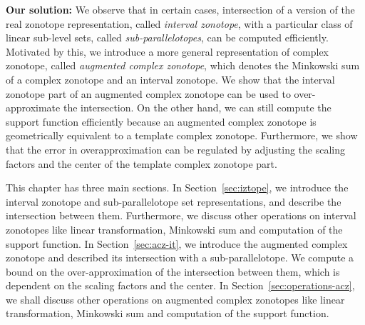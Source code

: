 {\bf Our solution: } We observe that in certain cases, intersection of
a version of the real zonotope representation, called \emph{interval
zonotope}, with a particular class of linear sub-level sets,
called \emph{sub-parallelotopes}, can be computed efficiently.
Motivated by this, we introduce a more general representation of
complex zonotope, called \emph{augmented complex zonotope}, which
denotes the Minkowski sum of a complex zonotope and an interval
zonotope.  We show that the interval zonotope part of an augmented
complex zonotope can be used to over-approximate the intersection.  On
the other hand, we can still compute the support function efficiently
because an augmented complex zonotope is geometrically equivalent to a
template complex zonotope.  Furthermore, we show that the error in
overapproximation can be regulated by adjusting the scaling factors
and the center of the template complex zonotope part.

This chapter has three main sections.  In Section~\ref{sec:iztope}, we
introduce the interval zonotope and sub-parallelotope set
representations, and describe the intersection between them.
Furthermore, we discuss other operations on interval zonotopes like
linear transformation, Minkowski sum and computation of the support
function.  In Section~\ref{sec:acz-it}, we introduce the augmented
complex zonotope and described its intersection with a
sub-parallelotope.  We compute a bound on the over-approximation of
the intersection between them, which is dependent on the scaling
factors and the center.  In Section~\ref{sec:operations-acz}, we shall
discuss other operations on augmented complex zonotopes like linear
transformation, Minkowski sum and computation of the support function.
